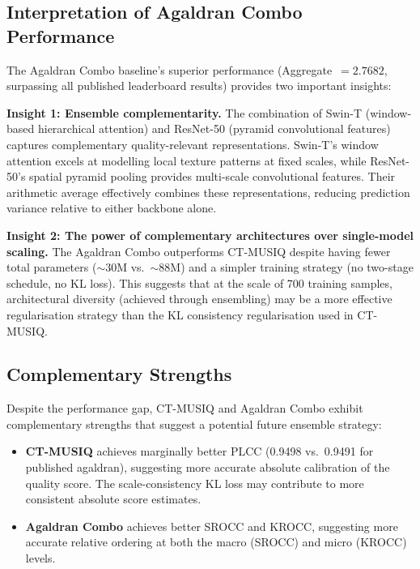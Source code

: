 \subsection{Interpretation of Agaldran Combo Performance}

The Agaldran Combo baseline's superior performance (Aggregate~$= 2.7682$, surpassing all
published leaderboard results) provides two important insights:

\textbf{Insight 1: Ensemble complementarity.} The combination of Swin-T (window-based
hierarchical attention) and ResNet-50 (pyramid convolutional features) captures
complementary quality-relevant representations. Swin-T's window attention excels at
modelling local texture patterns at fixed scales, while ResNet-50's spatial pyramid
pooling provides multi-scale convolutional features. Their arithmetic average effectively
combines these representations, reducing prediction variance relative to either backbone
alone.

\textbf{Insight 2: The power of complementary architectures over single-model scaling.}
The Agaldran Combo outperforms CT-MUSIQ despite having fewer total parameters
($\sim$30M vs.\ $\sim$88M) and a simpler training strategy (no two-stage schedule,
no KL loss). This suggests that at the scale of 700 training samples, architectural
diversity (achieved through ensembling) may be a more effective regularisation strategy
than the KL consistency regularisation used in CT-MUSIQ.

\subsection{Complementary Strengths}

Despite the performance gap, CT-MUSIQ and Agaldran Combo exhibit complementary strengths
that suggest a potential future ensemble strategy:

\begin{itemize}
    \item \textbf{CT-MUSIQ} achieves marginally better PLCC (0.9498 vs.\ 0.9491 for
          published agaldran), suggesting more accurate absolute calibration of the
          quality score. The scale-consistency KL loss may contribute to more consistent
          absolute score estimates.
    \item \textbf{Agaldran Combo} achieves better SROCC and KROCC, suggesting more
          accurate relative ordering at both the macro (SROCC) and micro (KROCC) levels.
\end{itemize}

